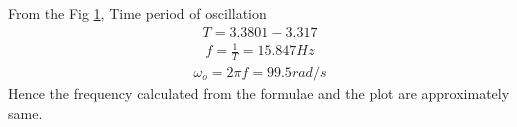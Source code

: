 \begin{enumerate}[label=\arabic*.,ref=\theenumi]
\begin{figure}[!ht]
\caption{}
\label{fig:es17btech11009_spice1}
\end{figure}
From the Fig \ref{fig:es17btech11009_spice1},
Time period of oscillation 
\begin{align}
    T = 3.3801 - 3.317
\end{align}
\begin{align}
    f = \frac{1}{T} = 15.847 Hz
\end{align}
\begin{align}
    \omega_{o} = 2\pi f = 99.5 rad/s
\end{align}
Hence the frequency calculated from the formulae and the plot are approximately same.
\end{enumerate}
